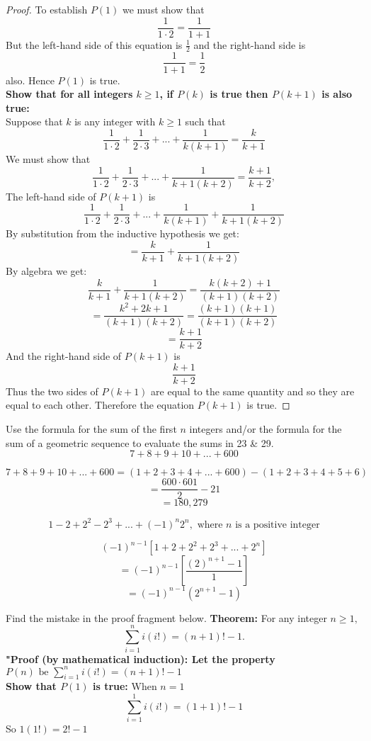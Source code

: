 \documentclass[12pt,letterpaper, onecolumn]{exam}
\begin{document}
\begin{questions}
\begin{solution}
\begin{proof}
				To establish $P(1)$ we must show that
				$$\frac{1}{1\cdot2}=\frac{1}{1+1}$$
				But the left-hand side of this equation is $\frac{1}{2}$ and the right-hand side is
				$$\frac{1}{1+1}=\frac{1}{2}$$
				also. Hence $P(1)$ is true.\\
				\textbf{Show that for all integers $k\geq1$, if $P(k)$ is true then $P(k+1)$ is also true:}\\
				Suppose that $k$ is any integer with $k\geq1$ such that
				$$\frac{1}{1\cdot2}+\frac{1}{2\cdot3}+...+\frac{1}{k(k+1)}=\frac{k}{k+1}$$
				We must show that
				$$\frac{1}{1\cdot2}+\frac{1}{2\cdot3}+...+\frac{1}{k+1(k+2)}=\frac{k+1}{k+2},$$
				The left-hand side of $P(k+1)$ is
				$$\frac{1}{1\cdot2}+\frac{1}{2\cdot3}+...+\frac{1}{k(k+1)}+\frac{1}{k+1(k+2)}$$ 
				By substitution from the inductive hypothesis we get:
				$$=\frac{k}{k+1}+\frac{1}{k+1(k+2)}$$
				By algebra we get:
				$$\frac{k}{k+1}+\frac{1}{k+1(k+2)}=\frac{k(k+2)+1}{(k+1)(k+2)}$$
				$$=\frac{k^2+2k+1}{(k+1)(k+2)}=\frac{(k+1)(k+1)}{(k+1)(k+2)}$$
				$$=\frac{k+1}{k+2}$$
				And the right-hand side of $P(k+1)$ is
				$$\frac{k+1}{k+2}$$
				Thus the two sides of $P(k+1)$ are equal to the same quantity and so they are equal to each other. Therefore the equation $P(k+1)$ is true.
			\end{proof}
		\end{solution}
		Use the formula for the sum of the first $n$ integers and/or the formula for the sum of a geometric sequence to evaluate the sums in 23 \& 29.
		\setcounter{question}{22}\question $$7+8+9+10+...+600$$
		\begin{solution}
			$$7+8+9+10+...+600=(1+2+3+4+...+600)-(1+2+3+4+5+6)$$
			$$=\frac{600\cdot601}{2}-21$$
			$$=180,279$$
		\end{solution}
		\setcounter{question}{28}\question $$1-2+2^2-2^3+...+(-1)^n2^n, \textrm{ where $n$ is a positive integer}$$
		\begin{solution}
			$$(-1)^{n-1}\left[1+2+2^2+2^3+...+2^n\right]$$
			$$=(-1)^{n-1}\left[\frac{(2)^{n+1}-1}{1}\right]$$
			$$=(-1)^{n-1}(2^{n+1}-1)$$
		\end{solution}
		Find the mistake in the proof fragment below.
		\setcounter{question}{34}\question \textbf{Theorem:} For any integer $n\geq1,$
		$$\sum_{i=1}^{n}i(i!)=(n+1)!-1.$$
		\textbf{"Proof (by mathematical induction): Let the property} $P(n) \textrm{ be } \sum_{i=1}^{n}i(i!)=(n+1)!-1$\\
		\textbf{Show that $P(1)$ is true:} When $n=1$
		$$\sum_{i=1}^{1}i(i!)=(1+1)!-1$$
		So $1(1!)=2!-1$\\

\end{questions}
\end{document}
